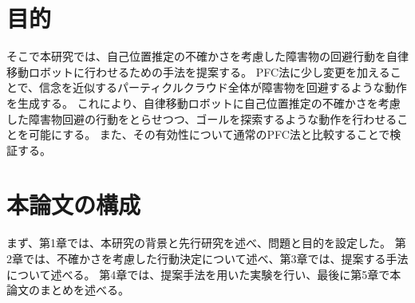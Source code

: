 



\section{目的}
そこで本研究では、自己位置推定の不確かさを考慮した障害物の回避行動を自律移動ロボットに行わせるための手法を提案する。
PFC法に少し変更を加えることで、信念を近似するパーティクルクラウド全体が障害物を回避するような動作を生成する。
これにより、自律移動ロボットに自己位置推定の不確かさを考慮した障害物回避の行動をとらせつつ、ゴールを探索するような動作を行わせることを可能にする。
また、その有効性について通常のPFC法と比較することで検証する。


\section{本論文の構成}
まず、第1章では、本研究の背景と先行研究を述べ、問題と目的を設定した。
第2章では、不確かさを考慮した行動決定について述べ、第3章では、提案する手法について述べる。
第4章では、提案手法を用いた実験を行い、最後に第5章で本論文のまとめを述べる。


